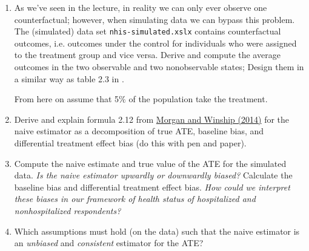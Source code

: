 \begin{enumerate}[\itshape i.)]
  \item As we've seen in the lecture, in reality we can only ever observe one counterfactual; however, when simulating data we can bypass this problem. The (simulated) data set \texttt{nhis-simulated.xslx} contains counterfactual outcomes, i.e. outcomes under the control for individuals who were assigned to the treatment group and vice versa.
    Derive and compute the average outcomes in the two observable and two nonobservable states; Design them in a similar way as table 2.3 in \href{https://www.cambridge.org/core/books/counterfactuals-and-causal-inference/5CC81E6DF63C5E5A8B88F79D45E1D1B7}{\cite{Morgan.2014}}.

From here on assume that 5$\%$ of the population take the treatment.

\item Derive and explain formula 2.12 from \href{https://www.cambridge.org/core/books/counterfactuals-and-causal-inference/5CC81E6DF63C5E5A8B88F79D45E1D1B7}{Morgan and Winship (2014)} for the naive estimator as a decomposition of true ATE, baseline bias, and differential treatment effect bias (do this with pen and paper).

\item Compute the naive estimate and true value of the ATE for the simulated data. \emph{Is the naive estimator upwardly or downwardly biased?} Calculate the baseline bias and differential treatment effect bias. \emph{How could we interpret these biases in our framework of health status of hospitalized and  nonhospitalized respondents?}

\item Which assumptions must hold (on the data) such that the naive estimator is an \emph{unbiased} and \emph{consistent} estimator for the ATE?
\end{enumerate}

\nocite{Angrist.2008}





